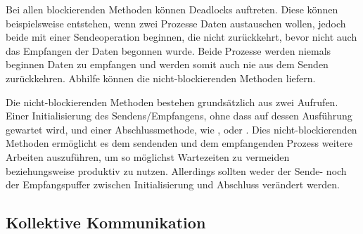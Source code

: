     Bei allen blockierenden Methoden können Deadlocks auftreten. Diese können beispielsweise entstehen, wenn zwei Prozesse Daten austauschen wollen, jedoch beide mit einer Sendeoperation
    beginnen, die nicht zurückkehrt, bevor nicht auch das Empfangen der Daten begonnen wurde. Beide Prozesse werden niemals beginnen Daten zu empfangen und werden somit auch
    nie aus dem Senden zurückkehren. Abhilfe können die nicht-blockierenden Methoden liefern.
    
    Die nicht-blockierenden Methoden bestehen grundsätzlich aus zwei Aufrufen. Einer Initialisierung des Sendens/Empfangens, ohne dass auf dessen Ausführung gewartet wird, und
    einer Abschlussmethode, wie ,  oder . Dies nicht-blockierenden Methoden ermöglicht es dem sendenden und dem empfangenden Prozess weitere Arbeiten
    auszuführen, um so möglichst Wartezeiten zu vermeiden beziehungsweise produktiv zu nutzen. Allerdings sollten weder der Sende- noch der Empfangspuffer zwischen Initialisierung und Abschluss
    verändert werden. \citep{mpi_p2p, mpiv31}
    
      
    \subsection{Kollektive Kommunikation}
    \label{sec:kolkom}
    
